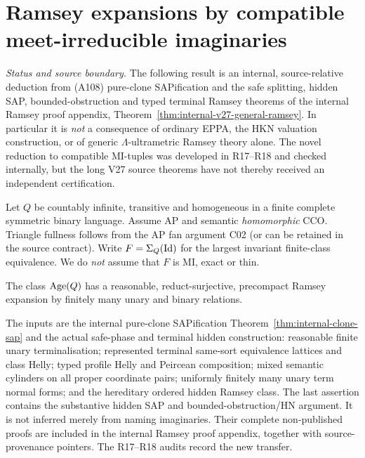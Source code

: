 \providecommand{\Emb}{\operatorname{Emb}}
\providecommand{\acl}{\operatorname{acl}}
\providecommand{\Spec}{\operatorname{Spec}}
\providecommand{\cl}{\operatorname{cl}}
\providecommand{\HH}{\mathcal{H}^{<}}
\providecommand{\KK}{\mathcal{K}^{*}}
\providecommand{\NN}{\mathbb{N}}

\section{Ramsey expansions by compatible meet-irreducible imaginaries}\label{sec:ramsey-clones}

\noindent\emph{Status and source boundary.}
The following result is an internal, source-relative deduction from
(A108) pure-clone SAPification and the safe splitting, hidden SAP,
bounded-obstruction and typed terminal Ramsey theorems of the
internal Ramsey proof appendix, Theorem~\ref{thm:internal-v27-general-ramsey}.  In particular it is
\emph{not} a consequence of ordinary EPPA, the HKN valuation
construction, or of generic $\Lambda$-ultrametric Ramsey theory
alone.  The novel reduction to compatible MI-tuples was developed in
R17--R18 and checked internally, but the long V27 source theorems
have not thereby received an independent certification.


Let $Q$ be countably infinite, transitive and homogeneous in a finite complete
symmetric binary language. Assume AP and semantic \emph{homomorphic} CCO.
Triangle fullness follows from the AP fan argument C02 (or can be retained in
the source contract). Write $F=\Sigma_Q(\mathrm{Id})$ for the largest invariant
finite-class equivalence. We do \emph{not} assume that $F$ is MI, exact or thin.

\begin{theorem}\label{thm:ramsey-general-ap}
The class $\operatorname{Age}(Q)$ has a reasonable, reduct-surjective, precompact Ramsey
expansion by finitely many unary and binary relations.
\end{theorem}

The inputs are the internal pure-clone SAPification Theorem~\ref{thm:internal-clone-sap} and the actual safe-phase and
terminal hidden construction: reasonable finite unary terminalisation;
represented terminal same-sort equivalence lattices and class Helly; typed
profile Helly and Peircean composition; mixed semantic cylinders on all proper
coordinate pairs; uniformly finitely many unary term normal forms; and the
hereditary ordered hidden Ramsey class. The last assertion contains the
substantive hidden SAP and bounded-obstruction/HN argument. It is not inferred
merely from naming imaginaries. Their complete non-published proofs are included in the internal Ramsey proof appendix, together with source-provenance pointers. The R17--R18 audits record the new transfer.

